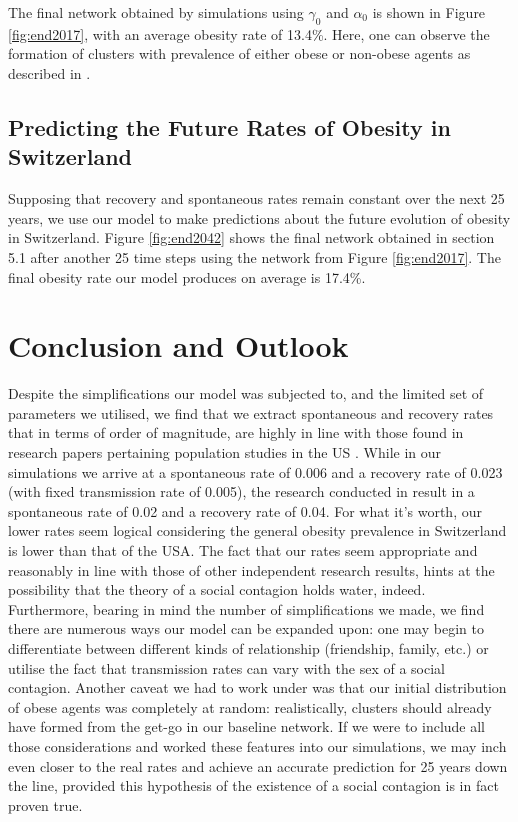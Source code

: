 \documentclass[11pt]{article}
\begin{document}
The final network obtained by simulations using $\gamma_0$ and $\alpha_0$ is shown in Figure \ref{fig:end2017}, with an average obesity rate of 13.4\%. Here, one can observe the formation of clusters with prevalence of either obese or non-obese agents as described in \cite{spreadOfObesityPaper}.

\subsection{Predicting the Future Rates of Obesity in Switzerland}

Supposing that recovery and spontaneous rates remain constant over the next 25 years, we use our model to make predictions about the future evolution of obesity in Switzerland. Figure \ref{fig:end2042} shows the final network obtained in section 5.1 after another 25 time steps using the network from Figure \ref{fig:end2017}. The final obesity rate our model produces on average is 17.4\%.

\newpage

\section{Conclusion and Outlook}

Despite the simplifications our model was subjected to, and the limited set of parameters we utilised, we find that we extract spontaneous and recovery rates that in terms of order of magnitude, are highly in line with those found in research papers pertaining population studies in the US \cite{infectiousDiseaseModeling}. While in our simulations we arrive at a spontaneous rate of 0.006 and a recovery rate of 0.023 (with fixed transmission rate of 0.005), the research conducted in \cite{infectiousDiseaseModeling} result in a spontaneous rate of 0.02 and a recovery rate of 0.04. For what it's worth, our lower rates seem logical considering the general obesity prevalence in Switzerland is lower than that of the USA. The  fact that our rates seem appropriate and reasonably in line with those of other independent research results, hints at the possibility that the theory of a social contagion holds water, indeed. \\

Furthermore, bearing in mind the number of simplifications we made, we find there are numerous ways our model can be expanded upon: one may begin to differentiate between different kinds of relationship (friendship, family, etc.)\cite{spreadOfObesityPaper} or utilise the fact that transmission rates can vary with the sex of a social contagion. Another caveat we had to work under was that our initial distribution of obese agents was completely at random: realistically, clusters should already have formed from the get-go in our baseline network. If we were to include all those considerations and worked these features into our simulations, we may inch even closer to the real rates and achieve an accurate prediction for 25 years down the line, provided this hypothesis of the existence of a social contagion is in fact proven true.\\
\end{document}
